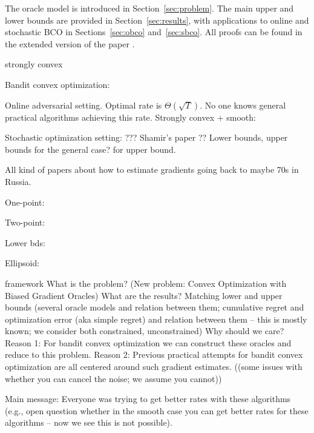 The oracle model is introduced in Section~\ref{sec:problem}. The main upper and lower bounds are provided in Section~\ref{sec:results}, with applications to online and stochastic BCO in Sections~\ref{sec:obco} and~\ref{sec:sbco}. All proofs can be found in the extended version of the paper \citep{HuPrGySz16long}.



strongly convex


Bandit convex optimization:

Online adversarial setting. Optimal rate is $\Theta(\sqrt{T})$.
No one knows general practical algorithms achieving this rate.
Strongly convex + smooth: \cite{hazan2014bandit}

Stochastic optimization setting: ??? Shamir's paper \cite{shamir2012complexity}??
Lower bounds, upper bounds for the general case?
\cite{hazan2014bandit} for upper bound.

All kind of papers about how to estimate gradients going back to maybe 70s in Russia.

One-point: \cite{flaxman2005online}

Two-point: \cite{AgDeXi10}

Lower bds: \cite{raginsky2011information} \cite{Chen88:LB-AoS}

Ellipsoid: \cite{AgFoHsuKaRa13:SIAM}



 framework
What is the problem? (New problem: Convex Optimization with Biased Gradient Oracles)
What are the results? Matching lower and upper bounds (several oracle models and relation between them; cumulative regret and optimization error (aka simple regret) and relation between them -- this is mostly known; we consider both constrained, unconstrained)
Why should we care?
Reason 1: For bandit convex optimization we can construct these oracles and reduce to this problem.
Reason 2: Previous practical attempts for bandit convex optimization are all centered around such gradient estimates.
((some issues with whether you can cancel the noise; we assume you cannot))

Main message: Everyone was trying to get better rates with these algorithms (e.g., open question whether in the smooth case you can get better rates for these algorithms -- now we see this is not possible).
\fi
